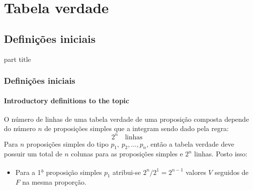 \section{Tabela verdade}
%
\subsection{Definições iniciais}
%
\begin{frame}[c]
    \begin{beamercolorbox}[rounded=true,shadow=true,sep=12pt,center]{part title}
        \insertsection\par
    \end{beamercolorbox}
\end{frame}
%
\begin{frame}[t]
    \frametitle{Definições iniciais}
    \framesubtitle{Introductory definitions to the topic}
    \begin{tcolorbox}[colback=blue!5,colframe=blue!60!black,adjusted title=Número de linhas]
        O número de linhas de uma tabela verdade de uma proposição composta depende do número $n$ de proposições simples que a integram sendo dado pela regra:
        \begin{equation}
            2^n \quad \text{linhas}
        \end{equation}
        \tcblower
        Para $n$ proposições simples do tipo $p_1,~p_2,\dots,p_n$, então a tabela verdade deve possuir um total de $n$ colunas para as proposições simples e $2^n$ linhas. Posto isso:
        \begin{itemize}
            \item Para a 1\textsuperscript{\d a} proposição simples $p_1$ atribui-se $2^n / 2^1 = 2^{n-1}$ valores $V$ seguidos de $F$ na mesma proporção.
        \end{itemize}
    \end{tcolorbox}
\end{frame}
%
